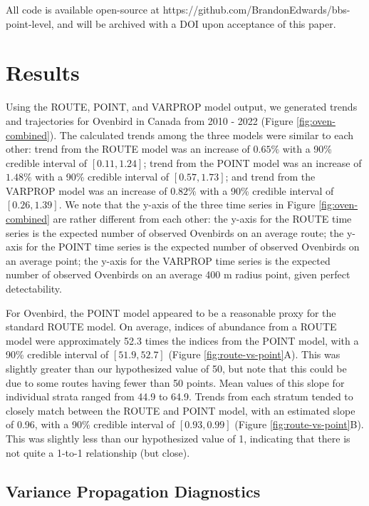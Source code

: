 \documentclass[12pt]{article}
\begin{document}
\par All code is available open-source at https://github.com/BrandonEdwards/bbs-point-level, and will be archived with a DOI upon acceptance of this paper.

\section{Results}

\par Using the ROUTE, POINT, and VARPROP model output, we generated trends and trajectories for Ovenbird in Canada from 2010 - 2022 (Figure \ref{fig:oven-combined}).
The calculated trends among the three models were similar to each other: trend from the ROUTE model was an increase of $0.65\%$ with a 90\% credible interval of $[0.11, 1.24]$; trend from the POINT model was an increase of $1.48\%$ with a 90\% credible interval of $[0.57, 1.73]$; and trend from the VARPROP model was an increase of $0.82\%$ with a 90\% credible interval of $[0.26, 1.39]$.
We note that the y-axis of the three time series in Figure \ref{fig:oven-combined} are rather different from each other: the y-axis for the ROUTE time series is the expected number of observed Ovenbirds on an average route; the y-axis for the POINT time series is the expected number of observed Ovenbirds on an average point; the y-axis for the VARPROP time series is the expected number of observed Ovenbirds on an average 400 m radius point, given perfect detectability.

\par For Ovenbird, the POINT model appeared to be a reasonable proxy for the standard ROUTE model.
On average, indices of abundance from a ROUTE model were approximately 52.3 times the indices from the POINT model, with a 90\% credible interval of $[51.9, 52.7]$ (Figure \ref{fig:route-vs-point}A).
This was slightly greater than our hypothesized value of 50, but note that this could be due to some routes having fewer than 50 points.
Mean values of this slope for individual strata ranged from 44.9 to 64.9.
Trends from each stratum tended to closely match between the ROUTE and POINT model, with an estimated slope of 0.96, with a 90\% credible interval of $[0.93, 0.99]$ (Figure \ref{fig:route-vs-point}B).
This was slightly less than our hypothesized value of 1, indicating that there is not quite a 1-to-1 relationship (but close).

\subsection{Variance Propagation Diagnostics}
\end{document}
